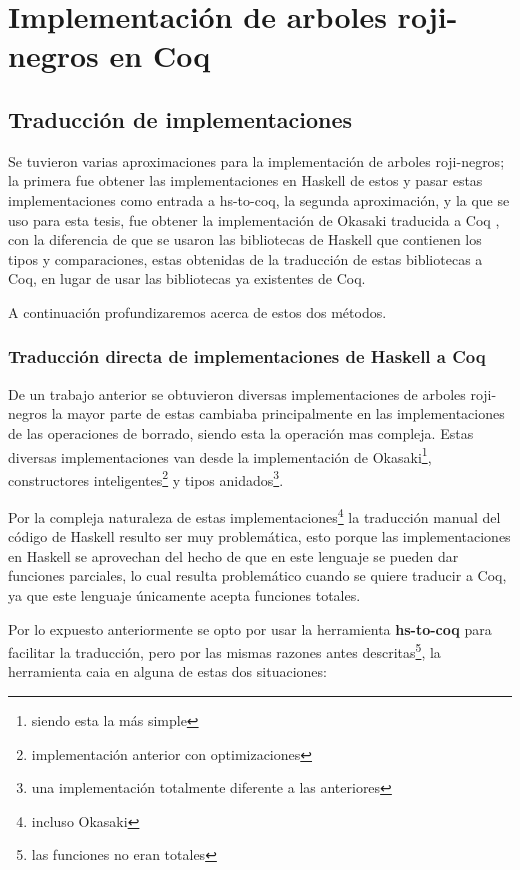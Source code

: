 \documentclass[8pt,leqno,pdflatex,spanish]{book}
\newcommand{\coq}{\textbf{Coq}}
\newcommand{\arns}{arboles roji-negros}
\theoremstyle{plain}
\theoremstyle{definition}
\theoremstyle{remark}
\begin{document}
\chapter{Implementación de arboles roji-negros en {\coq}}

\section{Traducción de implementaciones}
Se tuvieron varias aproximaciones para la implementación de {\arns}; la primera fue obtener las 
implementaciones en Haskell de estos\cite{tesisG} y pasar estas implementaciones como entrada a 
hs-to-coq, la segunda aproximación, y la que se uso para esta tesis, fue obtener la implementación 
de Okasaki traducida a Coq  \cite{MSetRBT}, con la diferencia de que se usaron las bibliotecas de 
Haskell que contienen los tipos y comparaciones, estas obtenidas de la traducción de estas 
bibliotecas a Coq, en lugar de usar las bibliotecas ya existentes de Coq.

A continuación profundizaremos acerca de estos dos métodos.

\subsection{Traducción directa de implementaciones de Haskell a Coq}
De un trabajo anterior\cite{tesisG} se obtuvieron diversas implementaciones de {\arns} la mayor 
parte de estas cambiaba principalmente en las implementaciones de las operaciones de borrado, 
siendo esta la operación mas compleja. 
Estas diversas implementaciones van desde la implementación de Okasaki\footnote{siendo esta la 
m\'as simple}, constructores inteligentes\footnote{implementaci\'on anterior con optimizaciones} y 
tipos anidados\footnote{una implementaci\'on totalmente diferente a las anteriores}.

Por la compleja naturaleza de estas implementaciones\footnote{incluso Okasaki} la traducción 
manual del código de Haskell resulto ser muy problemática, esto porque las implementaciones en 
Haskell se aprovechan del hecho de que en este lenguaje se pueden dar funciones parciales, lo cual 
resulta problemático cuando se quiere traducir a Coq, ya que este lenguaje únicamente acepta 
funciones totales.

Por lo expuesto anteriormente se opto por usar la herramienta \textbf{hs-to-coq} para facilitar la 
traducci\'on, pero por las mismas razones antes descritas\footnote{las funciones no eran totales},
la herramienta caia en alguna de estas dos situaciones:
\end{document}
